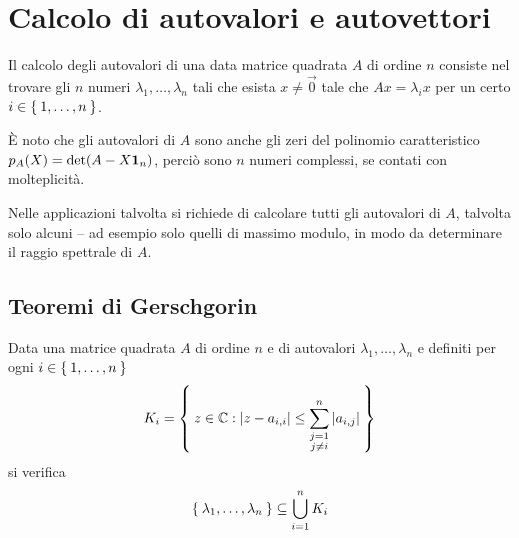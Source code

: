 \chapter{Calcolo di autovalori e autovettori}
	
	\noindent Il calcolo degli autovalori di una data matrice quadrata \(A\) di ordine \(n\) consiste nel trovare gli \(n\) numeri \(\lambda_1, \dots, \lambda_n\) tali che esista \(x \ne \vec{0}\) tale che \(A x = \lambda_i x\) per un certo \(i \in \Set{1, \dots, n}\).
	
	È noto che gli autovalori di \(A\) sono anche gli zeri del polinomio caratteristico \(p_A (X) = \det (A - X \mathbf{1}_n)\), perciò sono \(n\) numeri complessi, se contati con molteplicità.
	
	Nelle applicazioni talvolta si richiede di calcolare tutti gli autovalori di \(A\), talvolta solo alcuni -- ad esempio solo quelli di massimo modulo, in modo da determinare il raggio spettrale di \(A\).
	
\section{Teoremi di Gerschgorin}
	
	\begin{teorema}\label{th:gerschgorin-1}
		Data una matrice quadrata \(A\) di ordine \(n\) e di autovalori \(\lambda_1, \dots, \lambda_n\) e definiti per ogni \(i \in \Set{1, \dots, n}\)
		\begin{equation*}
			K_i = \Set{z \in \mathbb{C}: \abs{z - a_{i, i}} \le \sum_{\substack{j = 1 \\ j \ne i}}^n \abs{a_{i, j}}}
		\end{equation*}
		si verifica
		\begin{equation}\label{eq:gerschgorin-1}
			\Set{\lambda_1, \dots, \lambda_n} \subseteq \bigcup_{i = 1}^n K_i
		\end{equation}
	\end{teorema}

